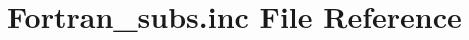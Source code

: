 \hypertarget{Fortran__subs_8inc}{}\section{Fortran\+\_\+subs.\+inc File Reference}
\label{Fortran__subs_8inc}
